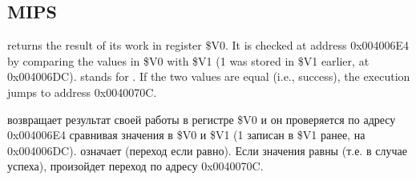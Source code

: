 \subsection{MIPS}



\ifdefined\ENGLISH
\scanf returns the result of its work in register \$V0. It is checked at address 0x004006E4
by comparing the values in \$V0 with \$V1 (1 was stored in \$V1 earlier, at 0x004006DC).
 stands for .
If the two values are equal (i.e., success), the execution jumps to address 0x0040070C.
\fi

\ifdefined\RUSSIAN
\scanf возвращает результат своей работы в регистре \$V0 и он проверяется по адресу 0x004006E4
сравнивая значения в \$V0 и \$V1 (1 записан в \$V1 ранее, на 0x004006DC).
 означает  (переход если равно).
Если значения равны (т.е. в случае успеха), произойдет переход по адресу 0x0040070C.
\fi

